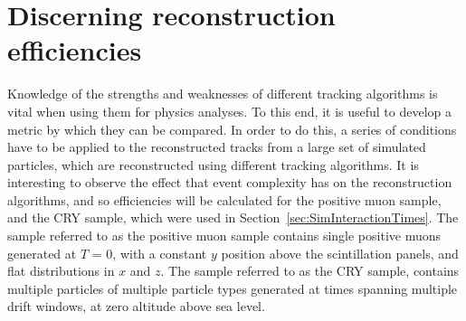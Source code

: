 \section{Discerning reconstruction efficiencies} \label{sec:SimRecoEffic} %
Knowledge of the strengths and weaknesses of different tracking algorithms is vital when using them for physics analyses. To this end, it is useful to develop a metric by which they can be compared. In order to do this, a series of conditions have to be applied to the reconstructed tracks from a large set of simulated particles, which are reconstructed using different tracking algorithms. It is interesting to observe the effect that event complexity has on the reconstruction algorithms, and so efficiencies will be calculated for the positive muon sample, and the CRY sample, which were used in Section~\ref{sec:SimInteractionTimes}. The sample referred to as the positive muon sample contains single positive muons generated at $T$ = 0, with a constant $y$ position above the scintillation panels, and flat distributions in $x$ and $z$. The sample referred to as the CRY sample, contains multiple particles of multiple particle types generated at times spanning multiple drift windows, at zero altitude above sea level. \\

